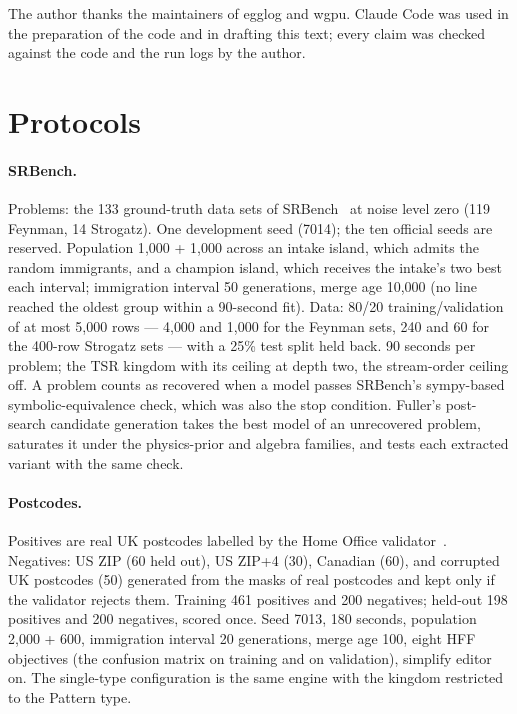 \documentclass[sigconf,nonacm]{acmart}
\newcommand{\ty}[1]{\textsf{#1}}
\begin{document}
\begin{acks}
The author thanks the maintainers of egglog and wgpu. Claude Code was used in
the preparation of the code and in drafting this text; every claim was checked
against the code and the run logs by the author.
\end{acks}




\appendix

\section{Protocols}
\label{sec:appendix}

\paragraph{SRBench.} Problems: the 133 ground-truth data sets of
SRBench~\cite{lacava2021srbench} at noise level zero (119 Feynman, 14 Strogatz).
One development seed (7014); the ten official seeds are reserved. Population
1{,}000 + 1{,}000 across an intake island, which admits the random immigrants,
and a champion island, which receives the intake's two best each interval;
immigration interval 50 generations, merge age 10{,}000 (no line reached the
oldest group within a 90-second fit). Data: 80/20 training/validation of at
most 5{,}000 rows --- 4{,}000 and 1{,}000 for the Feynman sets, 240 and 60 for
the 400-row Strogatz sets --- with a 25\% test split held back. 90 seconds per
problem; the TSR kingdom with its ceiling at depth two, the stream-order ceiling
off. A problem counts as recovered when a model passes
SRBench's sympy-based symbolic-equivalence check, which was also the stop
condition. Fuller's post-search candidate generation
takes the best model of an unrecovered problem, saturates it under the
physics-prior and algebra families, and tests each extracted variant with the
same check.

\paragraph{Postcodes.} Positives are real UK postcodes labelled by the Home
Office validator~\cite{govuk2015postcode}. Negatives: US ZIP (60 held out), US
ZIP+4 (30), Canadian (60), and corrupted UK postcodes (50) generated from the
masks of real postcodes and kept only if the validator rejects them. Training
461 positives and 200 negatives; held-out 198 positives and 200 negatives, scored
once. Seed 7013, 180 seconds, population 2{,}000 + 600, immigration interval
20 generations, merge age 100, eight HFF objectives (the confusion matrix on
training and on validation), simplify editor on. The
single-type configuration is the same engine with the kingdom restricted to the
\ty{Pattern} type.
\end{document}
